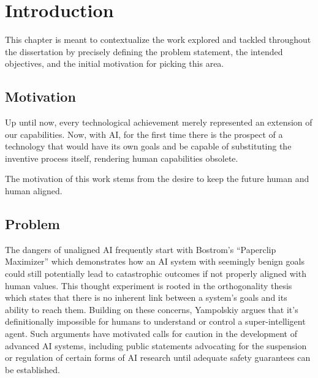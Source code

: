 \chapter{Introduction}\label{chap:introduction}

%

\begin{toreview}

	This chapter is meant to contextualize the work explored and tackled throughout the dissertation by precisely defining the problem statement, the intended objectives, and the initial motivation for picking this area.

	\section{Motivation}

	Up until now, every technological achievement merely represented an extension of our capabilities. Now, with AI, for the first time there is the prospect of a technology that would have its own goals and be capable of substituting the inventive process itself, rendering human capabilities obsolete.

	The motivation of this work stems from the desire to keep the future human and human aligned.

	\section{Problem}

	
	The dangers of unaligned AI frequently start with Bostrom’s “Paperclip Maximizer” which demonstrates how an AI system with seemingly benign goals could still potentially lead to catastrophic outcomes if not properly aligned with human values. This thought experiment is rooted in the orthogonality thesis which states that there is no inherent link between a system's goals and its ability to reach them.
	Building on these concerns, Yampolskiy argues that it's definitionally impossible for humans to understand or control a super-intelligent agent\cite{yampolskiy_controllability_2022}. Such arguments have motivated calls for caution in the development of advanced AI systems, including public statements advocating for the suspension or regulation of certain forms of AI research until adequate safety guarantees can be established\cite{FLI_SuperintelligenceStatement2025}.


\end{toreview}
